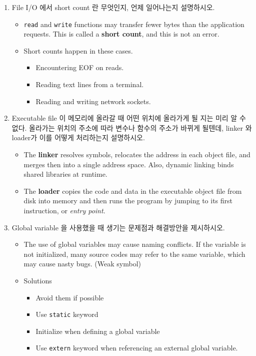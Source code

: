 \documentclass[12pt]{article}
\begin{document}
{\begin{enumerate}
\item File I/O 에서 short count 란 무엇인지, 언제 일어나는지 설명하시오.
\begin{itemize}
	\item \texttt{read} and \texttt{write} functions may transfer fewer bytes than the application requests. This is called a \textbf{short count}, and this is not an error.
	\item Short counts happen in these cases.
	\begin{itemize}
		\item Encountering EOF on reads.
		\item Reading text lines from a terminal.
		\item Reading and writing network sockets.
	\end{itemize}
\end{itemize}

\item Executable file 이 메모리에 올라갈 때 어떤 위치에 올라가게 될 지는 미리 알 수 없다. 올라가는 위치의 주소에 따라 변수나 함수의 주소가 바뀌게 될텐데, linker 와 loader가 이를 어떻게 처리하는지 설명하시오.
\begin{itemize}
	\item The \textbf{linker} resolves symbols, relocates the address in each object file, and merges then into a single address space. Also, dynamic linking binds shared libraries at runtime.
	\item The \textbf{loader} copies the code and data in the executable object file from disk into memory and then runs the program by jumping to its first instruction, or \textit{entry point}.
\end{itemize}

\item Global variable 을 사용했을 때 생기는 문제점과 해결방안을 제시하시오.
\begin{itemize}
	\item The use of global variables may cause naming conflicts. If the variable is not initialized, many source codes may refer to the same variable, which may cause nasty bugs. (Weak symbol)
	\item Solutions
	\begin{itemize}
		\item Avoid them if possible
		\item Use \texttt{static} keyword
		\item Initialize when defining a global variable
		\item Use \texttt{extern} keyword when referencing an external global variable.
	\end{itemize}
\end{itemize}


\end{enumerate}}
\end{document}
